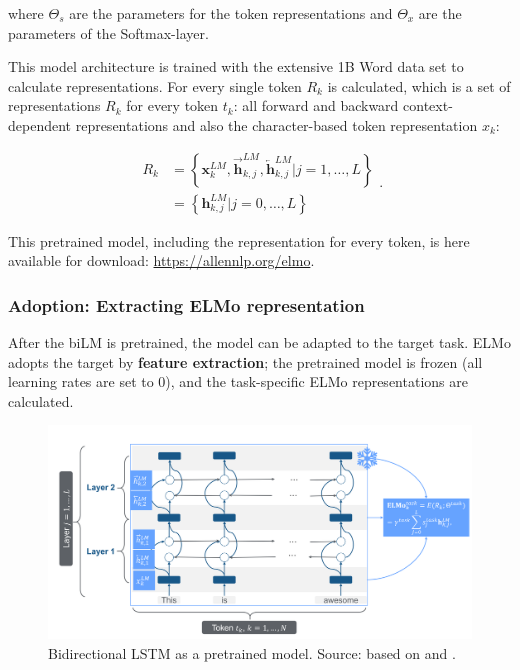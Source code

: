 \documentclass[]{krantz}
\begin{document}
where \(\Theta_{s}\) are the parameters for the token representations and
\(\Theta_{x}\) are the parameters of the Softmax-layer.

This model architecture is trained with the extensive 1B Word data set to calculate representations. For every single token \(R_k\) is calculated, which is a set of representations \(R_k\) for every token \(t_{k}\): all forward and backward context-dependent representations and also the character-based token representation \(x_k\):

\[\begin{aligned}
R_{k} &=\left\{\mathbf{x}_{k}^{L M}, \overrightarrow{\mathbf{h}}_{k, j}^{L M}, \overleftarrow{\mathbf{h}}_{k, j}^{L M} | j=1, \ldots, L\right\} \\
&=\left\{\mathbf{h}_{k, j}^{L M} | j=0, \ldots, L\right\}
\end{aligned}.\]

This pretrained model, including the representation for every token, is here available for download: \url{https://allennlp.org/elmo}.

\hypertarget{adoption-extracting-elmo-representation}{%
\subsubsection{Adoption: Extracting ELMo representation}\label{adoption-extracting-elmo-representation}}

After the biLM is pretrained, the model can be adapted to the target task. ELMo adopts the target by \textbf{feature extraction}; the pretrained model is frozen (all learning rates are set to 0), and the task-specific ELMo representations are calculated.



\begin{figure}

{\centering \includegraphics[width=0.9\linewidth]{figures/02-01-transfer-learning-for-nlp-1/elmo-adatption} 

}

\caption{Bidirectional LSTM as a pretrained model. Source: based on \citet{peter2018} and \citet{lstmpicture}.}\label{fig:ch21-elmoadoption}
\end{figure}
\end{document}
